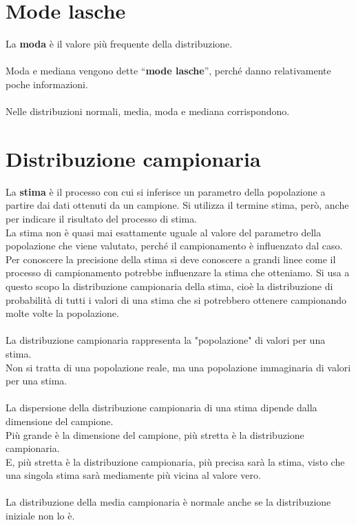 \documentclass[drafts, 10pt]{book}
\begin{document}
\section{Mode lasche}
La \textbf{moda} è il valore più frequente della distribuzione.
\\
\\
Moda e mediana vengono dette “\textbf{mode lasche}”, perché danno relativamente poche informazioni.
\\
\\
Nelle distribuzioni normali, media, moda e mediana corrispondono.

\section{Distribuzione campionaria}
La \textbf{stima} è il processo con cui si inferisce un parametro della popolazione a partire dai dati ottenuti da un campione. Si utilizza il termine stima, però, anche per indicare il risultato del processo di stima.
\\
La stima non è quasi mai esattamente uguale al valore del parametro della popolazione che viene valutato, perché il campionamento è influenzato dal caso.
\\
Per conoscere la precisione della stima si deve conoscere a grandi linee come il processo di campionamento potrebbe influenzare la stima che otteniamo. Si usa a questo scopo la distribuzione campionaria della stima, cioè la distribuzione di probabilità di tutti i valori di una stima che si potrebbero ottenere campionando molte volte la popolazione.
\\
\\
La distribuzione campionaria rappresenta la "popolazione" di valori per una stima. 
\\
Non si tratta di una popolazione reale, ma una popolazione immaginaria di valori per una stima.
\\
\\
La dispersione della distribuzione campionaria di una stima dipende dalla dimensione del campione. 
\\
Più grande è la dimensione del campione, più stretta è la distribuzione campionaria. 
\\
E, più stretta è la distribuzione campionaria, più precisa sarà la stima, visto che una singola stima sarà mediamente più vicina al valore vero.
\\
\\
La distribuzione della media campionaria è normale anche se la distribuzione iniziale non lo è.
\end{document}
